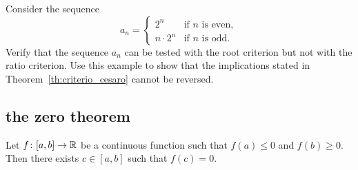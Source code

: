  \begin{exercise}
 Consider the sequence
 \[
 a_n =
 \begin{cases}
    2^n &\text{if $n$ is even},\\
    n\cdot 2^n &\text{if $n$ is odd}.
 \end{cases}
 \]
 Verify that the sequence $a_n$
  can be tested with the root criterion but
  not with the ratio criterion.
  Use this example to show that the implications
  stated in Theorem~\ref{th:criterio_cesaro} cannot
  be reversed.
\end{exercise}  

\subsection{the zero theorem}

\begin{theorem}
\mymark{***}%
%
%
\label{th:zeri}%
Let $f\colon[a,b] \to {\mathbb R}$ be a continuous function
such that $f(a)\le 0$ and $f(b)\ge 0$.
Then there exists
 $c\in [a,b]$ such that $f(c)=0$.
\end{theorem}

